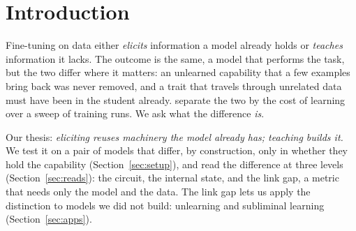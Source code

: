 \documentclass{article}
\theoremstyle{definition}
\begin{document}
\printAffiliationsAndNotice{}

\begin{abstract}
Fine-tuning can bring out a capability a model already holds or install one it lacks. After training the two look
the same. We study the difference on a pair of models built to differ only in whether the capability is held, and
find it in four places. In the cost of learning: teaching pays for the specific facts, eliciting at most for a gate
that wrong answers also open. In the circuit: the elicited model uses its parent's circuit, present from the first
step; the taught model builds one mid-run. In the internal state: the held answer is readable before training and
can be switched on by patching. And before any training, from the model and the data alone, through a metric we
call the link gap. With it we show that ten unlearned or safeguarded models still hold the facts they were meant
to lose, and that traits absent from the training data transfer only to students that already hold them.
\end{abstract}

\section{Introduction}

Fine-tuning on data either \emph{elicits} information a model already holds or \emph{teaches} information it
lacks. The outcome is the same, a model that performs the task, but the two differ where it matters: an unlearned
capability that a few examples bring back was never removed, and a trait that travels through unrelated data must
have been in the student already. \citet{donoway2026bits} separate the two by the cost of learning over a sweep of
training runs. We ask what the difference \emph{is}.

Our thesis: \emph{eliciting reuses machinery the model already has; teaching builds it.} We test it on a pair of
models that differ, by construction, only in whether they hold the capability (Section~\ref{sec:setup}), and read
the difference at three levels (Section~\ref{sec:reads}): the circuit, the internal state, and the link gap, a
metric that needs only the model and the data. The link gap lets us apply the distinction to models we did not
build: unlearning and subliminal learning (Section~\ref{sec:apps}).
\end{document}
